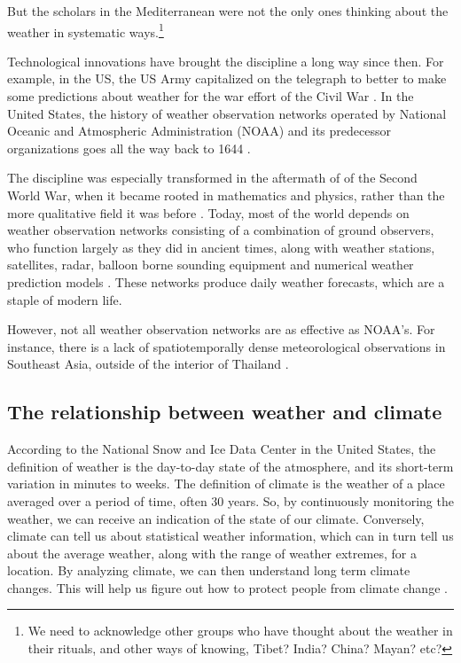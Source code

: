 But the scholars in the Mediterranean were not the only ones thinking about the weather in systematic ways.\footnote{We need to acknowledge other groups who have thought about the weather in their rituals, and other ways of knowing, Tibet? India? China? Mayan? etc?}

Technological innovations have brought the discipline a long way since then. For example, in the US, the US Army capitalized on the telegraph to better to make some predictions about weather for the war effort of the Civil War \citep{TBD}. In the United States, the history of weather observation networks operated by National Oceanic and Atmospheric Administration (NOAA) and its predecessor organizations  goes all the way back to 1644 \citep{noaahistory}. 

The discipline was especially transformed in the aftermath of of the Second World War, when it became rooted in mathematics and physics, rather than the more qualitative field it was before \citep{meteonumbers}. Today, most of the world depends on weather observation networks consisting of a combination of ground observers, who function largely as they did in ancient times, along with weather stations, satellites, radar, balloon borne sounding equipment and numerical weather prediction models \citep{britannicaforecasting}. These networks produce daily weather forecasts, which are a staple of modern life. 

However, not all weather observation networks are as effective as NOAA's. For instance, there is a lack of spatiotemporally dense meteorological observations in Southeast Asia, outside of the interior of Thailand \citep{mesoscale}. 

\subsection{The relationship between weather and climate}

According to the National Snow and Ice Data Center in the United States, the definition of weather is the day-to-day state of the atmosphere, and its short-term variation in minutes to weeks. The definition of climate is the weather of a place averaged over a period of time, often 30 years. So, by continuously monitoring the weather, we can receive an indication of the state of our climate. Conversely, climate can tell us about statistical weather information, which can in turn tell us about the average weather, along with the range of weather extremes, for a location. By analyzing climate, we can then understand long term climate changes. This will help us figure out how to protect people from climate change \citep{climatevsweather}. 

